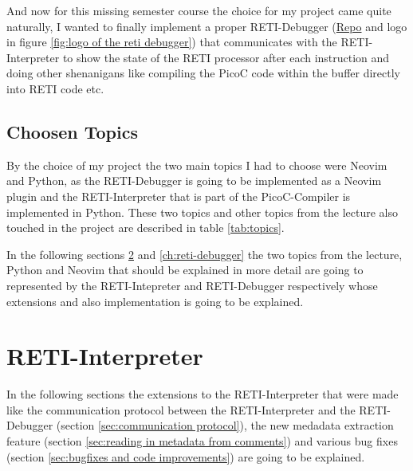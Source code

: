 \documentclass{report}
\begin{document}
And now for this missing semester course the choice for my project came quite naturally, I wanted to finally implement a proper \alert{RETI-Debugger} (\href{https://github.com/freiburg-missing-semester-course/project-matthejue}{Repo} and logo in figure \ref{fig:logo of the reti debugger}) that communicates with the RETI-Interpreter to show the state of the RETI processor after each instruction and doing other shenanigans like compiling the PicoC code within the buffer directly into RETI code etc.

\section{Choosen Topics}
\label{sec:choosen_topics}

By the choice of my project the two main topics I had to choose were \alert{Neovim} and \alert{Python}, as the \alert{RETI-Debugger} is going to be implemented as a Neovim plugin and the \alert{RETI-Interpreter} that is part of the PicoC-Compiler is implemented in Python. These two topics and other topics from the lecture also touched in the project are described in table \ref{tab:topics}.

In the following sections \ref{ch:reti-interpreter} and \ref{ch:reti-debugger} the two topics from the lecture, Python and Neovim that should be explained in more detail are going to represented by the RETI-Intepreter and RETI-Debugger respectively whose extensions and also implementation is going to be explained.



\chapter{RETI-Interpreter}
\label{ch:reti-interpreter}

In the following sections the extensions to the RETI-Interpreter that were made like the communication protocol between the RETI-Interpreter and the RETI-Debugger (section \ref{sec:communication protocol}), the new medadata extraction feature (section \ref{sec:reading in metadata from comments}) and various bug fixes (section \ref{sec:bugfixes and code improvements}) are going to be explained.
\end{document}
